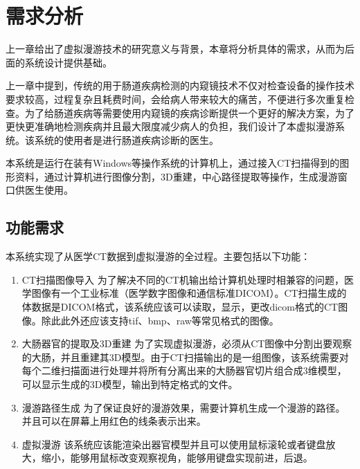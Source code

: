 \chapter{需求分析}
上一章给出了虚拟漫游技术的研究意义与背景，本章将分析具体的需求，从而为后面的系统设计提供基础。

上一章中提到，传统的用于肠道疾病检测的内窥镜技术不仅对检查设备的操作技术要求较高，过程复杂且耗费时间，会给病人带来较大的痛苦，不便进行多次重复检查。为了给肠道疾病等需要使用内窥镜的疾病诊断提供一个更好的解决方案，为了更快更准确地检测疾病并且最大限度减少病人的负担，我们设计了本虚拟漫游系统。该系统的使用者是进行肠道疾病诊断的医生。

本系统是运行在装有Windows等操作系统的计算机上，通过接入CT扫描得到的图形资料，通过计算机进行图像分割，3D重建，中心路径提取等操作，生成漫游窗口供医生使用。
\section{功能需求}
本系统实现了从医学CT数据到虚拟漫游的全过程。主要包括以下功能：
\begin{enumerate}
    \item CT扫描图像导入
为了解决不同的CT机输出给计算机处理时相兼容的问题，医学图像有一个工业标准（医学数字图像和通信标准DICOM）。CT扫描生成的体数据是DICOM格式，该系统应该可以读取，显示，更改dicom格式的CT图像。除此此外还应该支持tif、bmp、raw等常见格式的图像。
    \item 大肠器官的提取及3D重建
为了实现虚拟漫游，必须从CT图像中分割出要观察的大肠，并且重建其3D模型。由于CT扫描输出的是一组图像，该系统需要对每个二维扫描面进行处理并将所有分离出来的大肠器官切片组合成3维模型，可以显示生成的3D模型，输出到特定格式的文件。
    \item 漫游路径生成
为了保证良好的漫游效果，需要计算机生成一个漫游的路径。并且可以在屏幕上用红色的线条表示出来。
    \item 虚拟漫游
该系统应该能渲染出器官模型并且可以使用鼠标滚轮或者键盘放大，缩小，能够用鼠标改变观察视角，能够用键盘实现前进，后退。
\end{enumerate}

